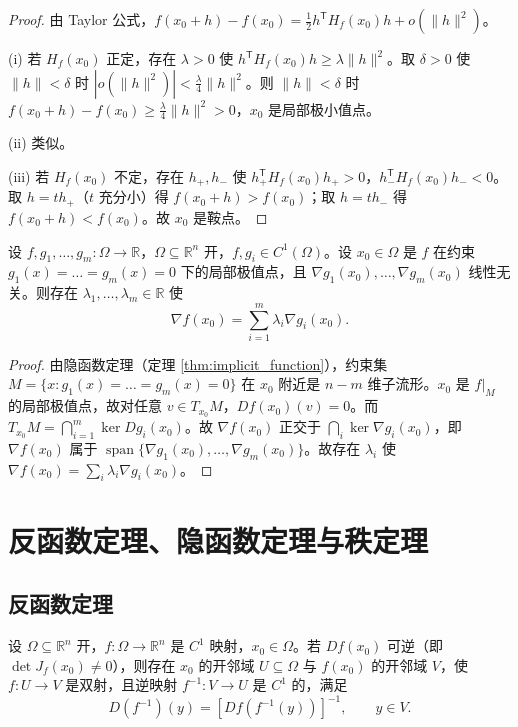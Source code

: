\begin{proof}
由 Taylor 公式，$f(x_0 + h) - f(x_0) = \frac{1}{2} h^{\mathsf T} H_f(x_0) h + o(\|h\|^2)$。

(i) 若 $H_f(x_0)$ 正定，存在 $\lambda > 0$ 使 $h^{\mathsf T} H_f(x_0) h \ge \lambda \|h\|^2$。取 $\delta > 0$ 使 $\|h\| < \delta$ 时 $|o(\|h\|^2)| < \frac{\lambda}{4} \|h\|^2$。则 $\|h\| < \delta$ 时 $f(x_0 + h) - f(x_0) \ge \frac{\lambda}{4} \|h\|^2 > 0$，$x_0$ 是局部极小值点。

(ii) 类似。

(iii) 若 $H_f(x_0)$ 不定，存在 $h_+, h_-$ 使 $h_+^{\mathsf T} H_f(x_0) h_+ > 0$，$h_-^{\mathsf T} H_f(x_0) h_- < 0$。取 $h = t h_+$（$t$ 充分小）得 $f(x_0 + h) > f(x_0)$；取 $h = t h_-$ 得 $f(x_0 + h) < f(x_0)$。故 $x_0$ 是鞍点。
\end{proof}

\begin{theorem}\label{thm:lagrange_multiplier_ra}
设 $f, g_1, \dots, g_m: \Omega \to \mathbb{R}$，$\Omega \subseteq \mathbb{R}^n$ 开，$f, g_i \in C^1(\Omega)$。设 $x_0 \in \Omega$ 是 $f$ 在约束 $g_1(x) = \dots = g_m(x) = 0$ 下的局部极值点，且 $\nabla g_1(x_0), \dots, \nabla g_m(x_0)$ 线性无关。则存在 $\lambda_1, \dots, \lambda_m \in \mathbb{R}$ 使
\[
\nabla f(x_0) = \sum_{i=1}^{m} \lambda_i \nabla g_i(x_0).
\]
\end{theorem}

\begin{proof}
由隐函数定理（定理 \ref{thm:implicit_function}），约束集 $M = \{x : g_1(x) = \dots = g_m(x) = 0\}$ 在 $x_0$ 附近是 $n - m$ 维子流形。$x_0$ 是 $f|_M$ 的局部极值点，故对任意 $v \in T_{x_0} M$，$Df(x_0)(v) = 0$。而 $T_{x_0} M = \bigcap_{i=1}^{m} \ker Dg_i(x_0)$。故 $\nabla f(x_0)$ 正交于 $\bigcap_i \ker \nabla g_i(x_0)$，即 $\nabla f(x_0)$ 属于 $\operatorname{span}\{\nabla g_1(x_0), \dots, \nabla g_m(x_0)\}$。故存在 $\lambda_i$ 使 $\nabla f(x_0) = \sum_i \lambda_i \nabla g_i(x_0)$。
\end{proof}

\section{反函数定理、隐函数定理与秩定理}

\subsection{反函数定理}

\begin{theorem}[反函数定理]\label{thm:inverse_function}
设 $\Omega \subseteq \mathbb{R}^n$ 开，$f: \Omega \to \mathbb{R}^n$ 是 $C^1$ 映射，$x_0 \in \Omega$。若 $Df(x_0)$ 可逆（即 $\det J_f(x_0) \neq 0$），则存在 $x_0$ 的开邻域 $U \subseteq \Omega$ 与 $f(x_0)$ 的开邻域 $V$，使 $f: U \to V$ 是双射，且逆映射 $f^{-1}: V \to U$ 是 $C^1$ 的，满足
\[
D(f^{-1})(y) = [Df(f^{-1}(y))]^{-1}, \qquad y \in V.
\]
\end{theorem}

